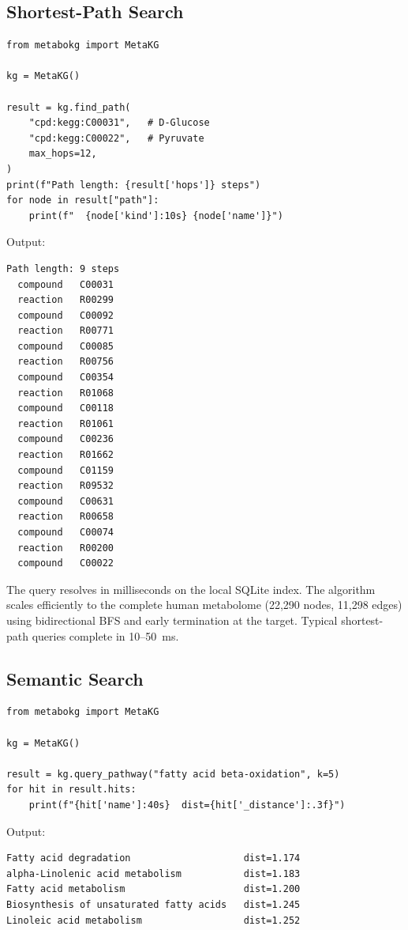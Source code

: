 \documentclass[10pt]{article}
\begin{document}
\subsection{Shortest-Path Search}

\begin{lstlisting}[style=python, caption={Finding the shortest metabolic route between two compounds.}]
from metabokg import MetaKG

kg = MetaKG()

result = kg.find_path(
    "cpd:kegg:C00031",   # D-Glucose
    "cpd:kegg:C00022",   # Pyruvate
    max_hops=12,
)
print(f"Path length: {result['hops']} steps")
for node in result["path"]:
    print(f"  {node['kind']:10s} {node['name']}")
\end{lstlisting}

Output:
\begin{lstlisting}[style=bash, caption={}]
Path length: 9 steps
  compound   C00031
  reaction   R00299
  compound   C00092
  reaction   R00771
  compound   C00085
  reaction   R00756
  compound   C00354
  reaction   R01068
  compound   C00118
  reaction   R01061
  compound   C00236
  reaction   R01662
  compound   C01159
  reaction   R09532
  compound   C00631
  reaction   R00658
  compound   C00074
  reaction   R00200
  compound   C00022
\end{lstlisting}

The query resolves in milliseconds on the local SQLite index. The algorithm
scales efficiently to the complete human metabolome (22,290 nodes, 11,298 edges)
using bidirectional BFS and early termination at the target. Typical shortest-path
queries complete in 10--50~ms.

\subsection{Semantic Search}

\begin{lstlisting}[style=python, caption={Semantic pathway retrieval.}]
from metabokg import MetaKG

kg = MetaKG()

result = kg.query_pathway("fatty acid beta-oxidation", k=5)
for hit in result.hits:
    print(f"{hit['name']:40s}  dist={hit['_distance']:.3f}")
\end{lstlisting}

Output:
\begin{lstlisting}[style=bash, caption={}]
Fatty acid degradation                    dist=1.174
alpha-Linolenic acid metabolism           dist=1.183
Fatty acid metabolism                     dist=1.200
Biosynthesis of unsaturated fatty acids   dist=1.245
Linoleic acid metabolism                  dist=1.252
\end{lstlisting}
\end{document}
